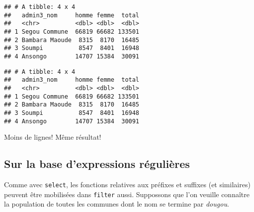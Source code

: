 \documentclass[]{book}
\newenvironment{Shaded}{\begin{snugshade}}{\end{snugshade}}
\newcommand{\KeywordTok}[1]{\textcolor[rgb]{0.13,0.29,0.53}{\textbf{#1}}}
\newcommand{\DataTypeTok}[1]{\textcolor[rgb]{0.13,0.29,0.53}{#1}}
\newcommand{\DecValTok}[1]{\textcolor[rgb]{0.00,0.00,0.81}{#1}}
\newcommand{\StringTok}[1]{\textcolor[rgb]{0.31,0.60,0.02}{#1}}
\newcommand{\CommentTok}[1]{\textcolor[rgb]{0.56,0.35,0.01}{\textit{#1}}}
\newcommand{\OperatorTok}[1]{\textcolor[rgb]{0.81,0.36,0.00}{\textbf{#1}}}
\newcommand{\NormalTok}[1]{#1}
\begin{document}
\begin{verbatim}
## # A tibble: 4 x 4
##   admin3_nom     homme femme  total
##   <chr>          <dbl> <dbl>  <dbl>
## 1 Segou Commune  66819 66682 133501
## 2 Bambara Maoude  8315  8170  16485
## 3 Soumpi          8547  8401  16948
## 4 Ansongo        14707 15384  30091
\end{verbatim}

\begin{Shaded}
\end{Shaded}

\begin{verbatim}
## # A tibble: 4 x 4
##   admin3_nom     homme femme  total
##   <chr>          <dbl> <dbl>  <dbl>
## 1 Segou Commune  66819 66682 133501
## 2 Bambara Maoude  8315  8170  16485
## 3 Soumpi          8547  8401  16948
## 4 Ansongo        14707 15384  30091
\end{verbatim}

Moins de lignes! Même résultat!

\subsection{Sur la base d'expressions
régulières}\label{sur-la-base-dexpressions-regulieres}

Comme avec \texttt{select}, les fonctions relatives aux préfixes et
suffixes (et similaires) peuvent être mobilisées dans \texttt{filter}
aussi. Suppossons que l'on veuille connaître la population de toutes les
communes dont le nom se termine par \emph{dougou}.
\end{document}
